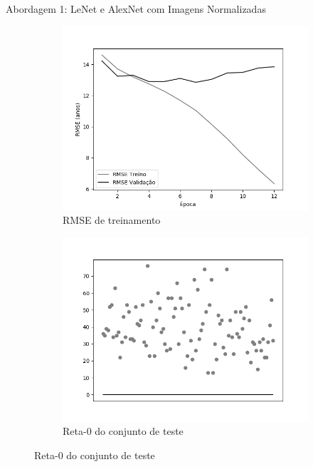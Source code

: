 \begin{frame}{\large{Abordagem 1: LeNet e AlexNet com Imagens Normalizadas}}
  \begin{figure}[h!]
    \caption{Resultados do treinamento e teste da CNN LeNet \emph{Leaky ReLU}}
  \begin{subfigure}[hb]{0.4\textwidth}
    \caption{RMSE de treinamento}
    \includegraphics[width=\linewidth]{img/graficos/history/lenet/fig-history-image-treat-1-lenet-lrelu-rmse.png}
  \end{subfigure}
  \begin{subfigure}[hb]{0.4\textwidth}
    \caption{Reta-0 do conjunto de teste}
   \includegraphics[width=\linewidth]{img/graficos/reta0/lenet/fig-reta-0-image-treat-1-lenet-lrelu.png}
  \end{subfigure}%
\end{figure}
\end{frame}

